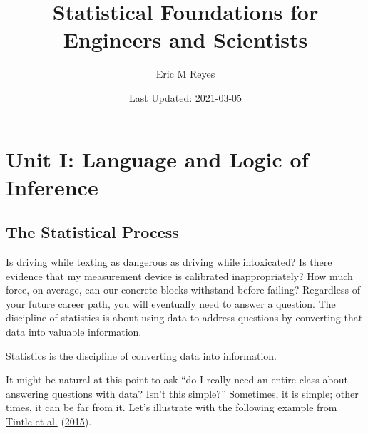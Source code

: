 \documentclass[
]{book}
\title{Statistical Foundations for Engineers and Scientists}
\author{Eric M Reyes}
\date{Last Updated: 2021-03-05}
\theoremstyle{plain}
\theoremstyle{mydefn}
\theoremstyle{myexmpl}
\theoremstyle{remark}
\begin{document}
\maketitle

{
\setcounter{tocdepth}{1}
\tableofcontents
}
\hypertarget{part-unit-i-language-and-logic-of-inference}{%
\part{Unit I: Language and Logic of Inference}\label{part-unit-i-language-and-logic-of-inference}}

\hypertarget{Basics}{%
\chapter{The Statistical Process}\label{Basics}}

Is driving while texting as dangerous as driving while intoxicated? Is there evidence that my measurement device is calibrated inappropriately? How much force, on average, can our concrete blocks withstand before failing? Regardless of your future career path, you will eventually need to answer a question. The discipline of statistics is about using data to address questions by converting that data into valuable information.

\begin{rmdkeyidea}
Statistics is the discipline of converting data into information.
\end{rmdkeyidea}

It might be natural at this point to ask ``do I really need an entire class about answering questions with data? Isn't this simple?'' Sometimes, it is simple; other times, it can be far from it. Let's illustrate with the following example from \protect\hyperlink{ref-Tintle2015}{Tintle et al.} (\protect\hyperlink{ref-Tintle2015}{2015}).
\end{document}
